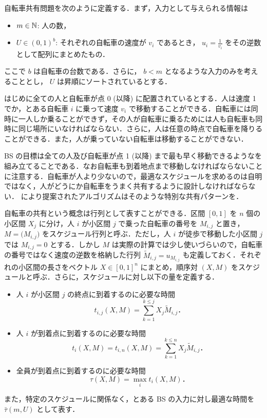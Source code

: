 自転車共有問題を次のように定義する\parencite{czyzowicz}．まず，入力として与えられる情報は
\begin{itemize}
\item $m \in \mathbb{N}$: 人の数，
\item $U \in (0, 1)^{b}$: それぞれの自転車の速度が $v_i$ であるとき， $u_i = \frac{1}{v_i}$ をその逆数として配列にまとめたもの．
\end{itemize}
ここで $b$ は自転車の台数である．さらに， $b < m$ となるような入力のみを考えることとし，  $U$ は昇順にソートされているとする．

はじめに全ての人と自転車が点 0 (以降) に配置されているとする．人は速度 1 でか，とある自転車 $i$ に乗って速度 $v_i$ で移動することができる．自転車には同時に一人しか乗ることができず，その人が自転車に乗るためには人も自転車も同時に同じ場所にいなければならない．さらに，人は任意の時点で自転車を降りることができる．また，人が乗っていない自転車は移動することができない．

BS の目標は全ての人及び自転車が点 1 (以降) まで最も早く移動できるようなを組み立てることである．なお自転車も到着地点まで移動しなければならないことに注意する．自転車が人より少ないので，最適なスケジュールを求めるのは自明ではなく，人がどうにか自転車をうまく共有するように設計しなければならない． \textcite{czyzowicz} により提案されたアルゴリズムはそのような特別な共有パターンを{\color{red}{求める}}．

自転車の共有という概念は行列として表すことができる．区間 $[0, 1]$ を $n$ 個の小区間 $X_j$ に分け，人 $i$ が小区間 $j$ で乗った自転車の番号を $M_{i,j}$ と置き， $M = \big(M_{i,j}\big)$ をスケジュール行列と呼ぶ．ただし，人 $i$ が徒歩で移動した小区間 $j$ では $M_{i,j} = 0$ とする．しかし $M$ は実際の計算では少し使いづらいので，自転車の番号ではなく速度の逆数を格納した行列 $\widetilde{M}_{i, j} = u_{M_{i, j}}$ も定義しておく．それぞれの小区間の長さをベクトル $X \in [0, 1]^{n}$ にまとめ，順序対 $(X, M)$ をスケジュールと呼ぶ．さらに，スケジュールに対し以下の量を定義する．
\begin{itemize}
  \item 人 $i$ が小区間 $j$ の終点に到着するのに必要な時間
  \[
    t_{i,j}(X, M) = \sum_{k = 1}^{k \leq j} X_j \widetilde M_{i, j}．
  \]
\item 人 $i$ が到着点に到着するのに必要な時間
  \[
    t_i(X, M) = t_{i,n}(X, M) = \sum_{k = 1}^{k \leq n} X_j \widetilde M_{i, j}．
  \]
\item 全員が到着点に到着するのに必要な時間
  \[
    \tau(X, M) = \max_{i} t_i(X, M)．
  \]
\end{itemize}
また，特定のスケジュールに関係なく，とある BS の入力に対し最適な時間を $\bar\tau(m, U)$ として表す．

